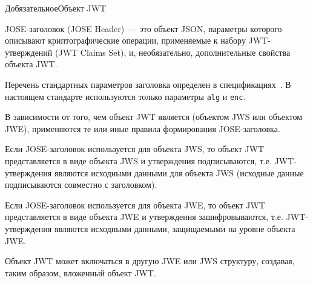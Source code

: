 \begin{appendix}{Д}{обязательное}{Объект JWT}

JOSE-заголовок (JOSE Header)~--- это объект JSON, параметры которого
описывают криптографические операции,
применяемые к набору JWT-утверждений (JWT Claims Set), и, необязательно, 
дополнительные свойства объекта JWT. 

Перечень стандартных параметров заголовка определен в 
спецификациях~\cite{RFC7515,RFC7516,RFC7519}.
%
В настоящем стандарте используются только параметры \lstinline{alg} и 
\lstinline{enc}. 
%

В зависимости от того, чем объект JWT является (объектом JWS или объектом JWE), 
применяются те или иные правила формирования JOSE-заголовка.

Если JOSE-заголовок используется для объекта JWS, то объект JWT представляется в
виде объекта JWS и утверждения подписываются, т.е. JWT-утверждения являются
исходными данными для объекта JWS (исходные данные подписываются совместно с
заголовком).

Если JOSE-заголовок используется для объекта JWE, то объект JWT представляется в
виде объекта JWE и утверждения зашифровываются, т.е. JWT-утверждения являются
исходными данными, защищаемыми на уровне объекта JWE.

Объект JWT может включаться в другую JWE или JWS структуру, создавая, таким
образом, вложенный объект JWT.

\end{appendix}
